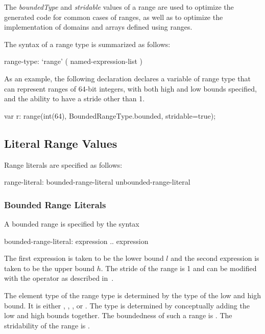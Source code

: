 \begin{rationale}
The \emph{boundedType} and \emph{stridable} values of a range are used
to optimize the generated code for common cases of ranges, as well as
to optimize the implementation of domains and arrays defined using
ranges.
\end{rationale}

The syntax of a range type is summarized as follows:
\begin{syntax}
range-type:
  `range' ( named-expression-list )
\end{syntax}

\begin{example}
As an example, the following declaration declares a variable 
of range type that can represent ranges of 64-bit integers, with both
high and low bounds specified, and the ability to have a stride other
than 1.
\begin{chapel}
var r: range(int(64), BoundedRangeType.bounded, stridable=true);
\end{chapel}
\end{example}

\subsection{Literal Range Values}
\label{Range_Literals}

Range literals are specified as follows:
\begin{syntax}
range-literal:
  bounded-range-literal
  unbounded-range-literal
\end{syntax}

\subsubsection{Bounded Range Literals}
\label{Bounded_Ranges}

A bounded range is specified by the syntax
\begin{syntax}
bounded-range-literal:
  expression .. expression
\end{syntax}
The first expression is taken to be the lower bound $l$ and the second
expression is taken to be the upper bound $h$.  The stride of the
range is 1 and can be modified with the  operator as described
in~.

The element type of the range type is determined by the type of the
low and high bound.  It is either , ,
, or .  The type is determined by
conceptually adding the low and high bounds together.  The boundedness
of such a range is .  The stridability of
the range is .

